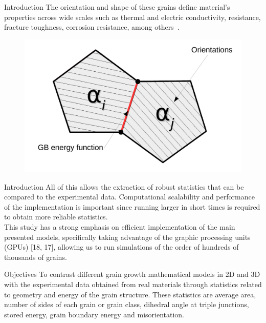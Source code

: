 \documentclass[usenames,dvipsnames]{beamer}
\begin{document}
\begin{frame}{Introduction}
    The orientation and shape of these grains define material's properties across wide scales such as thermal and electric conductivity, resistance, fracture toughness, corrosion resistance, among others~\cite{kinderlehrermultiscale, Kinderlehrer2006, Brons2013, torres2015}.

    \begin{figure}
        \centering
        \includegraphics[scale=0.5]{figures/extras/grainenergy.pdf}
    \end{figure}
\end{frame}

\begin{frame}{Introduction}
    All of this allows the extraction of robust statistics that can be compared to the experimental data.  Computational scalability and performance of the implementation is important since running larger in short times is required to obtain more reliable statistics.\\

    This study has a strong emphasis on efficient implementation of the main presented models, specifically taking advantage of the graphic processing units (GPUs) [18, 17], allowing us to run simulations of the order of hundreds of thousands of grains.
\end{frame}

\begin{frame}{Objectives}
To contrast different grain growth mathematical models in 2D and 3D with the experimental data obtained from real materials through statistics related to geometry and energy of the grain structure. These statistics are average area, number of sides of each grain or grain class, dihedral angle at triple junctions, stored energy, grain boundary energy and misorientation.
\end{frame}
\end{document}
